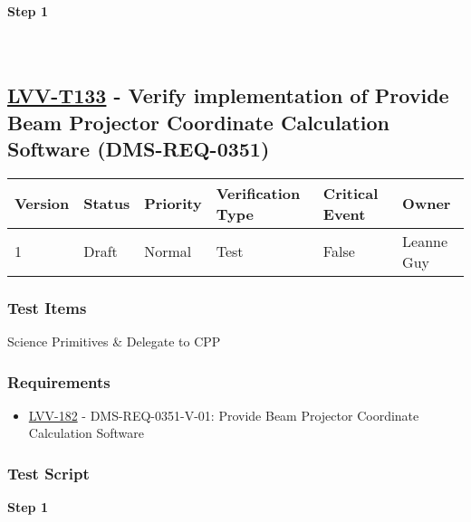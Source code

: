 \textbf{Step 1}\\
~\\
~\\

\hypertarget{lvv-t133---verify-implementation-of-provide-beam-projector-coordinate-calculation-software-dms-req-0351}{%
\subsection{\texorpdfstring{\href{https://jira.lsstcorp.org/secure/Tests.jspa\#/testCase/LVV-T133}{LVV-T133}
- Verify implementation of Provide Beam Projector Coordinate Calculation
Software
(DMS-REQ-0351)}{LVV-T133 - Verify implementation of Provide Beam Projector Coordinate Calculation Software (DMS-REQ-0351)}}\label{lvv-t133---verify-implementation-of-provide-beam-projector-coordinate-calculation-software-dms-req-0351}}

\begin{longtable}[]{@{}llllll@{}}
\toprule
Version & Status & Priority & Verification Type & Critical Event &
Owner\tabularnewline
\midrule
\endhead
1 & Draft & Normal & Test & False & Leanne Guy\tabularnewline
\bottomrule
\end{longtable}

\hypertarget{test-items-109}{%
\subsubsection{Test Items}\label{test-items-109}}

Science Primitives \& Delegate to CPP

\hypertarget{requirements-110}{%
\subsubsection{Requirements}\label{requirements-110}}

\begin{itemize}
\tightlist
\item
  \href{https://jira.lsstcorp.org/browse/LVV-182}{LVV-182} -
  DMS-REQ-0351-V-01: Provide Beam Projector Coordinate Calculation
  Software
\end{itemize}

\hypertarget{test-script-110}{%
\subsubsection{Test Script}\label{test-script-110}}

\textbf{Step 1}\\
~\\
~\\

